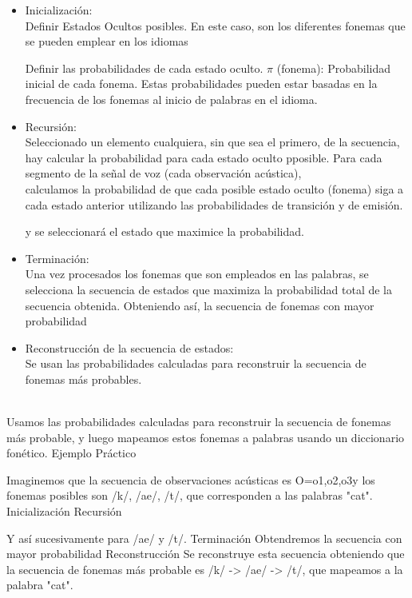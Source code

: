 \documentclass[11pt,openany]{book}
\begin{document}
\begin{itemize}
      \item Inicialización: \\ 
      Definir Estados Ocultos posibles. En este caso, son los diferentes fonemas que se pueden emplear en los idiomas
      
      Definir las probabilidades de cada estado oculto. $\pi$ (fonema): Probabilidad inicial de cada fonema. Estas probabilidades pueden estar basadas en la frecuencia de los fonemas al inicio de palabras en el idioma.
      \item Recursión: \\
      Seleccionado un elemento cualquiera, sin que sea el primero, de la secuencia, hay calcular la probabilidad para cada estado oculto pposible. Para cada segmento de la señal de voz (cada observación acústica), \\
      calculamos la probabilidad de que cada posible estado oculto (fonema) siga a cada estado anterior utilizando las probabilidades de transición y de emisión.


      y se seleccionará el estado que maximice la probabilidad.
      \item Terminación: \\
      Una vez procesados los fonemas que son empleados en las palabras, se selecciona la secuencia de estados que maximiza la probabilidad total de la secuencia obtenida. Obteniendo así, la secuencia de fonemas con mayor probabilidad
      
      \item Reconstrucción de la secuencia de estados: \\
      Se usan las probabilidades calculadas para reconstruir la secuencia de fonemas más probables. \\ \\
\end{itemize}
Usamos las probabilidades calculadas para reconstruir la secuencia de fonemas más probable, y luego mapeamos estos fonemas a palabras usando un diccionario fonético.
Ejemplo Práctico

Imaginemos que la secuencia de observaciones acústicas es O={o1,o2,o3}y los fonemas posibles son /k/, /ae/, /t/, que corresponden a las palabras "cat".
Inicialización
Recursión

Y así sucesivamente para /ae/ y /t/.
Terminación
Obtendremos la secuencia con mayor probabilidad
Reconstrucción
Se reconstruye esta secuencia obteniendo que la secuencia de fonemas más probable es /k/ -> /ae/ -> /t/, que mapeamos a la palabra "cat".
\end{document}
